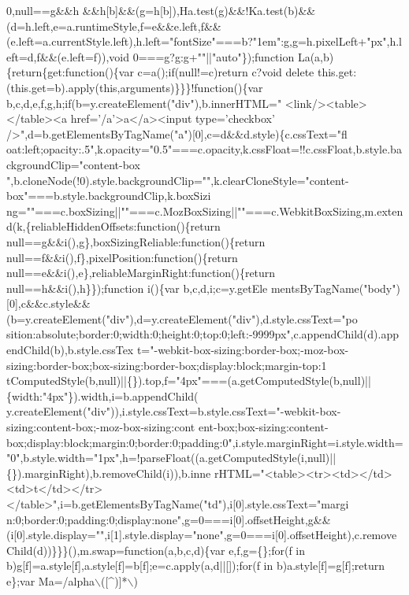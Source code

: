 \begin{DoxyCode}
{       0,null==g&&h
      &&h[b]&&(g=h[b]),Ha.test(g)&&!Ka.test(b)&&(d=h.left,e=a.runtimeStyle,f=e&&e.left,f&&(e.left=a.currentStyle.left),h.left="fontSize"===b?"1em":g,g=h.pixelLeft+"px",h.left=d,f&&(e.left=f)),void
       0===g?g:g+""||"auto"\});function La(a,b)\{return\{get:function()\{var c=a();if(null!=c)return c?void delete
       this.get:(this.get=b).apply(this,arguments)\}\}\}!function()\{var b,c,d,e,f,g,h;if(b=y.createElement("div"),b.innerHTML=" 
       <link/><table></table><a href='}/a\textcolor{stringliteral}{'>a</a><input type='}checkbox\textcolor{stringliteral}{'
      />",d=b.getElementsByTagName("a")[0],c=d&&d.style)\{c.cssText="fl
      oat:left;opacity:.5",k.opacity="0.5"===c.opacity,k.cssFloat=!!c.cssFloat,b.style.backgroundClip="content-box
      ",b.cloneNode(!0).style.backgroundClip="",k.clearCloneStyle="content-box"===b.style.backgroundClip,k.boxSizi
      ng=""===c.boxSizing||""===c.MozBoxSizing||""===c.WebkitBoxSizing,m.extend(k,\{reliableHiddenOffsets:function()\{return null==g&&i(),g\},boxSizingReliable:function()\{return
       null==f&&i(),f\},pixelPosition:function()\{return null==e&&i(),e\},reliableMarginRight:function()\{return null==h&&i(),h\}\});function i()\{var
       b,c,d,i;c=y.getEle
      mentsByTagName("body")[0],c&&c.style&&(b=y.createElement("div"),d=y.createElement("div"),d.style.cssText="po
      sition:absolute;border:0;width:0;height:0;top:0;left:-9999px",c.appendChild(d).appendChild(b),b.style.cssTex
      t="-webkit-box-sizing:border-box;-moz-box-sizing:border-box;box-sizing:border-box;display:block;margin-top:1
      tComputedStyle(b,null)||\{\}).top,f="4px"===(a.getComputedStyle(b,null)||\{width:"4px"\}).width,i=b.appendChild(
      y.createElement("div")),i.style.cssText=b.style.cssText="-webkit-box-sizing:content-box;-moz-box-sizing:cont
      ent-box;box-sizing:content-box;display:block;margin:0;border:0;padding:0",i.style.marginRight=i.style.width=
      "0",b.style.width="1px",h=!parseFloat((a.getComputedStyle(i,null)||\{\}).marginRight),b.removeChild(i)),b.inne
      rHTML="<table><tr><td></td><td>t</td></tr></table>",i=b.getElementsByTagName("td"),i[0].style.cssText="margi
      n:0;border:0;padding:0;display:none",g=0===i[0].offsetHeight,g&&(i[0].style.display="",i[1].style.display="none",g=0===i[0].offsetHeight),c.removeChild(d))\}\}\}(),m.swap=function(a,b,c,d)\{var e,f,g=\{\};for(f in
       b)g[f]=a.style[f],a.style[f]=b[f];e=c.apply(a,d||[]);for(f in b)a.style[f]=g[f];return e\};var Ma=/alpha\(\backslash\)([^)]*\(\backslash\))
}
\end{DoxyCode}

